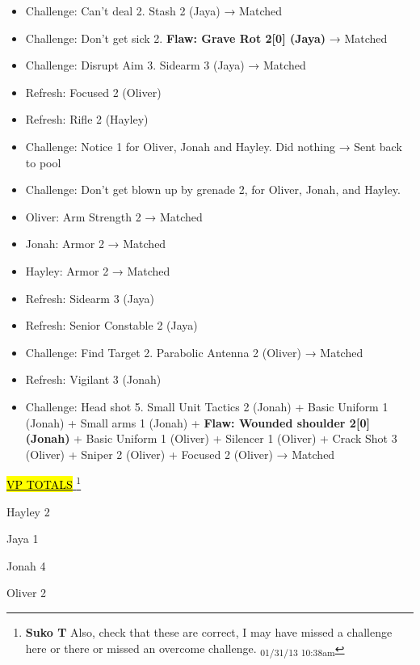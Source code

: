 \begin{itemize}
\item Challenge: Can't deal 2.  Stash 2 (Jaya) → Matched
\item Challenge: Don't get sick 2. \textbf{ {\color[RGB]{255,0,0}Flaw: Grave Rot 2{[}0{]} (Jaya)} } → Matched
\item Challenge: Disrupt Aim 3. Sidearm 3 (Jaya) → Matched
\item Refresh: Focused 2 (Oliver)
\item Refresh: Rifle 2 (Hayley)
\item Challenge: Notice 1 for Oliver, Jonah and Hayley. Did nothing → Sent back to pool
\item Challenge: Don't get blown up by grenade 2, for Oliver, Jonah, and Hayley.  
\end{itemize}

\begin{itemize}
\item Oliver: Arm Strength 2 → Matched
\item Jonah: Armor 2 → Matched
\item Hayley: Armor 2 → Matched
\end{itemize}

\begin{itemize}
\item Refresh: Sidearm 3 (Jaya)
\item Refresh: Senior Constable 2 (Jaya)
\item Challenge: Find Target 2.  Parabolic Antenna 2 (Oliver) → Matched
\item Refresh: Vigilant 3 (Jonah)
\item Challenge: Head shot 5.  Small Unit Tactics 2 (Jonah) + Basic Uniform 1 (Jonah) + Small arms 1 (Jonah) + \textbf{ {\color[RGB]{255,0,0}Flaw: Wounded shoulder 2{[}0{]} (Jonah)} } + Basic Uniform 1 (Oliver) + Silencer 1 (Oliver) + Crack Shot 3 (Oliver) + Sniper 2 (Oliver) + Focused 2 (Oliver) → Matched
\end{itemize}





\underline{  {\LARGE \hl{VP TOTALS} }  }\footnote{\textbf{Suko T }Also, check that these are correct, I may have missed a challenge here or there or missed an overcome challenge. \textsubscript{01/31/13 10:38am}}

Hayley 2

Jaya 1

Jonah 4

Oliver 2



